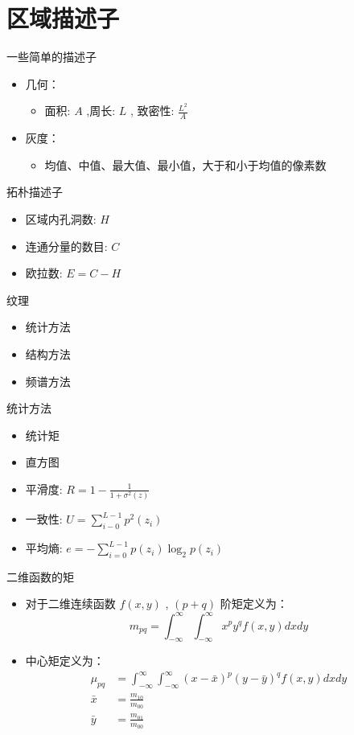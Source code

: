 \documentclass[presentation]{beamer}
\begin{document}
\section{区域描述子}
\label{sec:org9ef21ee}
\begin{frame}[label={sec:orgb2e427e}]{一些简单的描述子}
\begin{itemize}
\item 几何：
\begin{itemize}
\item 面积: \(A\) ,周长: \(L\) , 致密性: \(\frac{L^2}{A}\)
\end{itemize}
\item 灰度：
\begin{itemize}
\item 均值、中值、最大值、最小值，大于和小于均值的像素数
\end{itemize}
\end{itemize}
\end{frame}
\begin{frame}[label={sec:org6d7408b}]{拓朴描述子}
\begin{itemize}
\item 区域内孔洞数: \(H\)
\item 连通分量的数目: \(C\)
\item 欧拉数:  \(E=C-H\)
\end{itemize}
\end{frame}
\begin{frame}[label={sec:org9e1cd5e}]{纹理}
\begin{itemize}
\item 统计方法
\item 结构方法
\item 频谱方法
\end{itemize}
\end{frame}
\begin{frame}[label={sec:orgc2b176c}]{统计方法}
\begin{itemize}
\item 统计矩
\item 直方图
\item 平滑度: \(R=1-\frac{1}{1+\sigma^2(z)}\)
\item 一致性: \(U=\sum_{i-0}^{L-1}p^2(z_i)\)
\item 平均熵: \(e=-\sum_{i=0}^{L-1}p(z_i)\log_2p (z_i)\)
\end{itemize}
\end{frame}
\begin{frame}[label={sec:orgc8360ba}]{二维函数的矩}
\begin{itemize}
\item 对于二维连续函数 \(f(x,y)\) , \((p+q)\) 阶矩定义为：
\[ m_{pq} =\int_{-\infty}^{\infty}\int_{-\infty}^{\infty}x^p y^q f(x,y)dxdy \]
\item 中心矩定义为：
\begin{align*}
  \mu_{pq} &=\int_{-\infty}^{\infty}\int_{-\infty}^{\infty}(x-\bar x)^p(y-\bar y)^q f(x,y)dxdy \\
   \bar x &= \frac{m_{10}}{m_{00}} \\
   \bar y &= \frac{m_{01}}{m_{00}}
\end{align*}
\end{itemize}
\end{frame}
\end{document}
